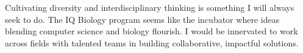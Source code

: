 \documentclass[12pt]{article}
\begin{document}
Cultivating diversity and interdisciplinary thinking is something I will always seek to do. The IQ Biology program seems like the incubator where ideas blending computer science and biology flourish. I would be innervated to work across fields with talented teams in building collaborative, impactful solutions.
\end{document}
